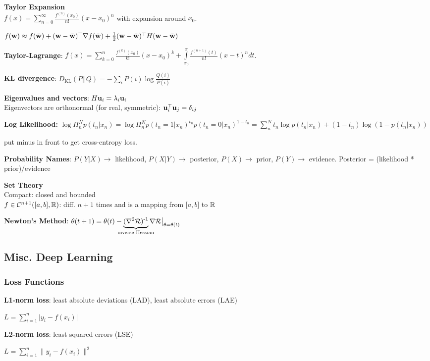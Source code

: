 \textbf{Taylor Expansion}\\
\tab$f(x)=\sum\limits^\infty_{n=0}\frac{f^{(n)}(x_0)}{n!}(x-x_0)^n$ with expansion around $x_0$.

\tab$f(\mathbf w)\approx f(\bar{\mathbf w})+(\mathbf w-\bar{\mathbf w})^{\mathop{\mathrm{\top}}}\nabla f(\bar{\mathbf w})+\frac{1}{2}(\mathbf w-\bar{\mathbf w})^{\mathop{\mathrm{\top}}} H (\mathbf w-\bar{\mathbf w})$

\textbf{Taylor-Lagrange}:
$f(x)=\sum\limits^n_{k=0}\frac{f^{(k)}(x_0)}{k!}(x-x_0)^k+\int\limits^x_{x_0}\frac{f^{(n+1)}(t)}{n!}(x-t)^n dt$.

\textbf{KL divergence}: $D_\text{KL}(P||Q)=-\sum_i P(i) \log \frac{Q(i)}{P(i)}$

\textbf{Eigenvalues and vectors}: $H\mathbf u_i=\lambda_i\mathbf u_i$\\
Eigenvectors are orthonormal (for real, symmetric): $\mathbf u_i^{\mathop{\mathrm{\top}}}\mathbf u_j=\delta_{ij}$

\textbf{Log Likelihood:} $\log\Pi^N_n p(t_n|x_n)=\log\Pi^N_n p(t_n=1|x_n)^{t_n} p(t_n=0|x_n)^{1-t_n}=\sum^N_n t_n \log p(t_n|x_n) + (1-t_n) \log (1-p(t_n|x_n))$

\tab put minus in front to get cross-entropy loss.

\textbf{Probability Names}: $P(Y|X)\xrightarrow{}$ likelihood, $P(X|Y)\xrightarrow{}$ posterior, $P(X)\xrightarrow{}$ prior, $P(Y)\xrightarrow{}$ evidence. Posterior = (likelihood * prior)/evidence

\textbf{Set Theory}\\
Compact: closed and bounded\\
$f\in\mathcal{C}^{n+1}(\lbrack a,b\rbrack,\mathbb R)$: diff. $n+1$ times and is a mapping from $\lbrack a,b\rbrack$ to $\mathbb R$

\textbf{Newton's Method}: $\theta(t+1)=\theta(t)-\!\!\!\!\!\underbrace{(\nabla^2\cR)\inv}_\text{inverse Hessian}\!\!\!\!\!\nabla\cR\bigr|_{\theta=\theta(t)}$

\subsection*{Misc. Deep Learning}
\subsubsection*{Loss Functions}
\textbf{L1-norm loss}: least absolute deviations (LAD), least absolute errors (LAE) 

\tab $L=\sum^n_{i=1} \lvert y_i - f(x_i) \rvert$

\textbf{L2-norm loss}: least-squared errors (LSE)

\tab $L=\sum^n_{i=1} \lVert y_i - f(x_i) \rVert^2$

